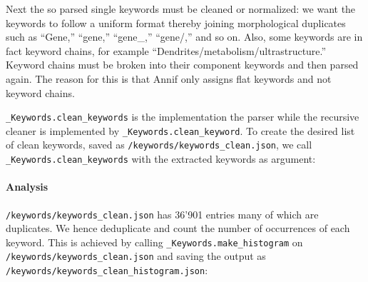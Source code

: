 Next the so parsed single keywords must be cleaned or normalized: we
want the keywords to follow a uniform format thereby joining
morphological duplicates such as ``Gene,'' ``gene,'' ``gene\_,''
``gene/,'' and so on. Also, some keywords are in fact keyword chains,
for example ``Dendrites/metabolism/ultrastructure.'' Keyword chains must
be broken into their component keywords and then parsed again. The
reason for this is that Annif only assigns flat keywords and not keyword
chains.

\texttt{\_Keywords.clean\_keywords} is the implementation the parser
while the recursive cleaner is implemented by
\texttt{\_Keywords.clean\_keyword}. To create the desired list of clean
keywords, saved as \texttt{/keywords/keywords\_clean.json}, we call
\texttt{\_Keywords.clean\_keywords} with the extracted keywords as
argument:

\begin{Shaded}
\begin{Highlighting}[]
\OperatorTok{=}\OperatorTok{+} \NormalTok{)}
\OperatorTok{=}
\OperatorTok{+} \NormalTok{)}
\end{Highlighting}
\end{Shaded}

\hypertarget{analysis-1}{%
\paragraph{Analysis}\label{analysis-1}}

\texttt{/keywords/keywords\_clean.json} has 36'901 entries many of which
are duplicates. We hence deduplicate and count the number of occurrences
of each keyword. This is achieved by calling
\texttt{\_Keywords.make\_histogram} on
\texttt{/keywords/keywords\_clean.json} and saving the output as
\texttt{/keywords/keywords\_clean\_histogram.json}:

\begin{Shaded}
\begin{Highlighting}[]
\OperatorTok{=}\OperatorTok{+} \NormalTok{)}
\OperatorTok{=}
\OperatorTok{+} \NormalTok{)}
\end{Highlighting}
\end{Shaded}


